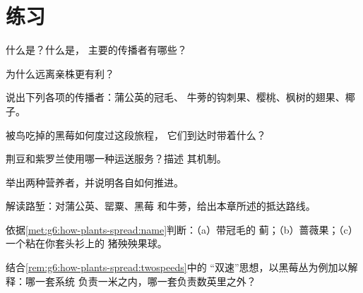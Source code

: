 \section{练习}

\begin{exercise}[$\star$]\label{exo:g6:how-plants-spread:1}
什么是？什么是，
主要的传播者有哪些？
\end{exercise}

\begin{exercise}[$\star$]\label{exo:g6:how-plants-spread:2}
为什么远离亲株更有利？
\end{exercise}

\begin{exercise}[$\star$]\label{exo:g6:how-plants-spread:3}
说出下列各项的传播者：蒲公英的冠毛、
牛蒡的钩刺果、樱桃、枫树的翅果、椰子。
\end{exercise}

\begin{exercise}[$\star$]\label{exo:g6:how-plants-spread:4}
被鸟吃掉的黑莓如何度过这段旅程，
它们到达时带着什么？
\end{exercise}

\begin{exercise}[$\star$]\label{exo:g6:how-plants-spread:5}
荆豆和紫罗兰使用哪一种运送服务？描述
其机制。
\end{exercise}

\begin{exercise}[$\star$]\label{exo:g6:how-plants-spread:6}
举出两种营养者，并说明各自如何推进。
\end{exercise}

\begin{exercise}[$\star\star$]\label{exo:g6:how-plants-spread:7}
解读路堑：对蒲公英、罂粟、黑莓
和牛蒡，给出本章所述的抵达路线。
\end{exercise}

\begin{exercise}[$\star\star$]\label{exo:g6:how-plants-spread:8}
依据\cref{met:g6:how-plants-spread:name}判断：（a）带冠毛的
蓟；（b）蔷薇果；（c）一个粘在你套头衫上的
猪殃殃果球。
\end{exercise}

\begin{exercise}[$\star\star$]\label{exo:g6:how-plants-spread:9}
结合\cref{rem:g6:how-plants-spread:twospeeds}中的
“双速”思想，以黑莓丛为例加以解释：哪一套系统
负责一米之内，哪一套负责数英里之外？
\end{exercise}

